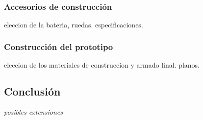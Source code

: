 \subsubsection{Accesorios de construcci\'on}
\label{HAaccesorios}

eleccion de la bateria, ruedas.
especificaciones.

\subsubsection{Construcci\'on del prototipo}
\label{HACprototipo}

eleccion de los materiales de construccion y armado final.
planos.

\subsection{Conclusi\'on}
\label{Hconclusion}

\emph{posibles extensiones}
